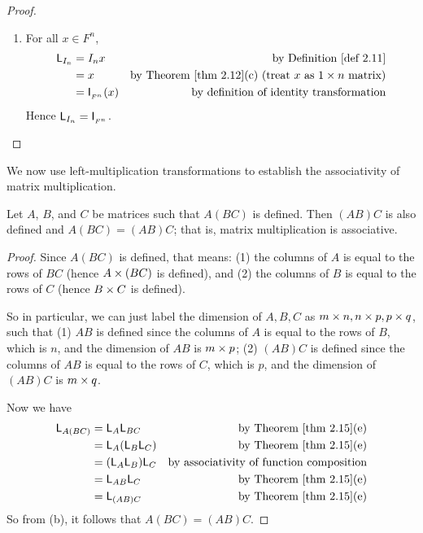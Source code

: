 \begin{proof}
\begin{enumerate}
\item For all \(x \in F^n\),
\begin{align*}
    \LMTRAN_{I_n} & = I_n x & \text{by \DEF{2.11}} \\
                  & = x & \text{by \THM{2.12}(c) (treat \(x\) as \(1 \X n\) matrix)} \\
                  & = \ITRAN{F^n}(x) & \text{by definition of identity transformation}
\end{align*}
Hence \(\textsf{L}_{I_n} = \textsf{I}_{_{F^n}}\).
\end{enumerate}
\end{proof}

We now use left-multiplication transformations to establish the associativity of matrix multiplication.

\begin{theorem} \label{thm 2.16}
Let \(A\), \(B\), and \(C\) be matrices such that \(A(BC)\) is defined.
Then \((AB)C\) is also defined and \(A(BC) = (AB)C\);
that is, matrix multiplication is associative.
\end{theorem}

\begin{proof}
Since \(A(BC)\) is defined, that means: (1) the columns of \(A\) is equal to the rows of \(BC\) (hence \(A \times (BC)\) is defined), and (2) the columns of \(B\) is equal to the rows of \(C\) (hence \(B \times C\) is defined).

So in particular, we can just label the dimension of \(A, B, C\) as \(m \times n, n \times p, p \times q\),
such that (1) \(AB\) is defined since the columns of \(A\) is equal to the rows of \(B\), which is \(n\),
and the dimension of \(AB\) is \(m \times p\);
(2) \((AB)C\) is defined since the columns of \(AB\) is equal to the rows of \(C\), which is \(p\), and the dimension of \((AB)C\) is \(m \times q\).

Now we have
\begin{align*}
    \LMTRAN_{A(BC)} & = \LMTRAN_A \LMTRAN_{BC} & \text{by \THM{2.15}(e)} \\
                    & = \LMTRAN_A (\LMTRAN_B \LMTRAN_C) & \text{by \THM{2.15}(e)} \\
                    & = (\LMTRAN_A \LMTRAN_B) \LMTRAN_C & \text{by associativity of function composition} \\
                    & = \LMTRAN_{AB} \LMTRAN_C & \text{by \THM{2.15}(e)} \\
                    & = \LMTRAN_{(AB)C} & \text{by \THM{2.15}(e)}
\end{align*}
So from (b), it follows that \(A(BC) = (AB)C\).
\end{proof}

